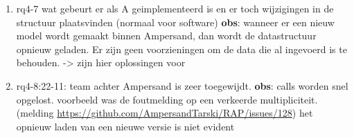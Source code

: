 \begin{enumerate}
    \item rq4-7 wat gebeurt er als A geimplementeerd is en er toch wijzigingen in de structuur plaatsvinden (normaal voor software)
    \newline\textbf{obs}: wanneer er een nieuw model wordt gemaakt binnen Ampersand, dan wordt de datastructuur opnieuw geladen.
    Er zijn geen voorzieningen om de data die al ingevoerd is te behouden.
    -> zijn hier oplossingen voor
    
    \item rq4-8:22-11: team achter Ampersand is zeer toegewijdt. 
    \newline\textbf{obs}: calls worden snel opgelost. 
    voorbeeld was de foutmelding op een verkeerde multipliciteit. 
    (melding \url{https://github.com/AmpersandTarski/RAP/issues/128})
    het opnieuw laden van een nieuwe versie is niet evident
    
    
\end{enumerate}